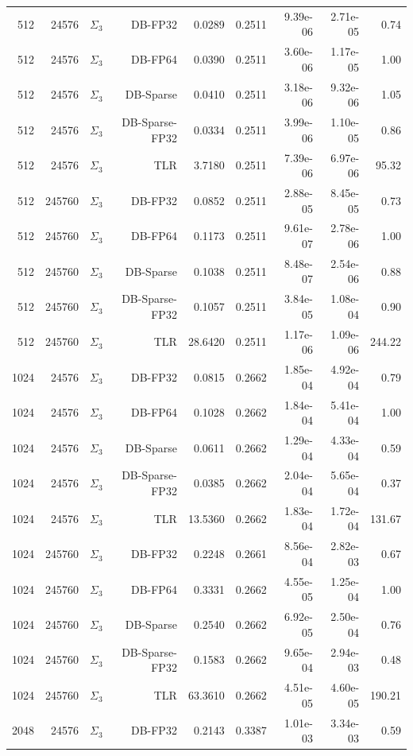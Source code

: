 \begin{tabular}{|r|r|r|r|r|r|r|r|r|}
  512 & 24576 & $\Sigma_3$ & DB-FP32 & 0.0289 & 0.2511 & 9.39e-06 & 2.71e-05 & 0.74 \\
  512 & 24576 & $\Sigma_3$ & DB-FP64 & 0.0390 & 0.2511 & 3.60e-06 & 1.17e-05 & 1.00 \\
  512 & 24576 & $\Sigma_3$ & DB-Sparse & 0.0410 & 0.2511 & 3.18e-06 & 9.32e-06 & 1.05 \\
  512 & 24576 & $\Sigma_3$ & DB-Sparse-FP32 & 0.0334 & 0.2511 & 3.99e-06 & 1.10e-05 & 0.86 \\
  512 & 24576 & $\Sigma_3$ & TLR & 3.7180 & 0.2511 & 7.39e-06 & 6.97e-06 & 95.32 \\
  512 & 245760 & $\Sigma_3$ & DB-FP32 & 0.0852 & 0.2511 & 2.88e-05 & 8.45e-05 & 0.73 \\
  512 & 245760 & $\Sigma_3$ & DB-FP64 & 0.1173 & 0.2511 & 9.61e-07 & 2.78e-06 & 1.00 \\
  512 & 245760 & $\Sigma_3$ & DB-Sparse & 0.1038 & 0.2511 & 8.48e-07 & 2.54e-06 & 0.88 \\
  512 & 245760 & $\Sigma_3$ & DB-Sparse-FP32 & 0.1057 & 0.2511 & 3.84e-05 & 1.08e-04 & 0.90 \\
  512 & 245760 & $\Sigma_3$ & TLR & 28.6420 & 0.2511 & 1.17e-06 & 1.09e-06 & 244.22 \\
  1024 & 24576 & $\Sigma_3$ & DB-FP32 & 0.0815 & 0.2662 & 1.85e-04 & 4.92e-04 & 0.79 \\
  1024 & 24576 & $\Sigma_3$ & DB-FP64 & 0.1028 & 0.2662 & 1.84e-04 & 5.41e-04 & 1.00 \\
  1024 & 24576 & $\Sigma_3$ & DB-Sparse & 0.0611 & 0.2662 & 1.29e-04 & 4.33e-04 & 0.59 \\
  1024 & 24576 & $\Sigma_3$ & DB-Sparse-FP32 & 0.0385 & 0.2662 & 2.04e-04 & 5.65e-04 & 0.37 \\
  1024 & 24576 & $\Sigma_3$ & TLR & 13.5360 & 0.2662 & 1.83e-04 & 1.72e-04 & 131.67 \\
  1024 & 245760 & $\Sigma_3$ & DB-FP32 & 0.2248 & 0.2661 & 8.56e-04 & 2.82e-03 & 0.67 \\
  1024 & 245760 & $\Sigma_3$ & DB-FP64 & 0.3331 & 0.2662 & 4.55e-05 & 1.25e-04 & 1.00 \\
  1024 & 245760 & $\Sigma_3$ & DB-Sparse & 0.2540 & 0.2662 & 6.92e-05 & 2.50e-04 & 0.76 \\
  1024 & 245760 & $\Sigma_3$ & DB-Sparse-FP32 & 0.1583 & 0.2662 & 9.65e-04 & 2.94e-03 & 0.48 \\
  1024 & 245760 & $\Sigma_3$ & TLR & 63.3610 & 0.2662 & 4.51e-05 & 4.60e-05 & 190.21 \\
  2048 & 24576 & $\Sigma_3$ & DB-FP32 & 0.2143 & 0.3387 & 1.01e-03 & 3.34e-03 & 0.59 \\

\end{tabular}
